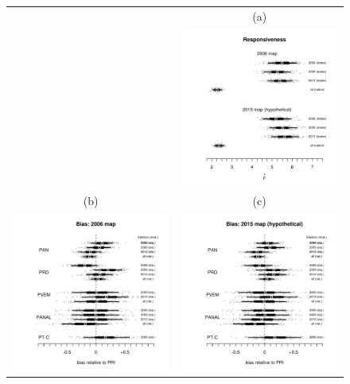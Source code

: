 \documentclass[letter,12pt]{article}
\begin{document}
\begin{figure}
\begin{center}
  \begin{tabular}{cc}
    & (a) \\
    & 
    \includegraphics[width=.5\columnwidth]{resp200612s0s3R.pdf} \\
    (b) & (c) \\
    \includegraphics[width=.5\columnwidth]{bias200612s0R.pdf} &
    \includegraphics[width=.5\columnwidth]{bias200612s3R.pdf} 

\end{tabular}
\end{center}
\end{figure}
\end{document}
